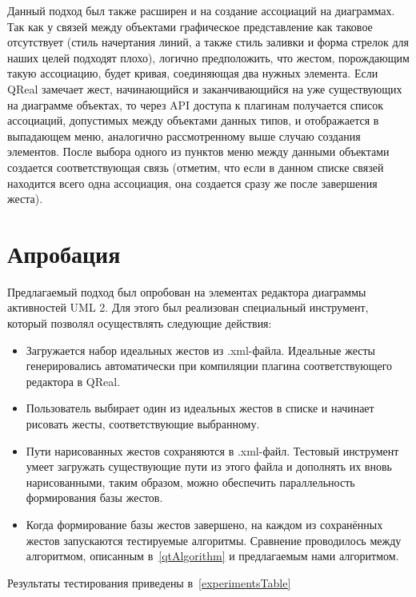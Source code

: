 \documentclass[a5paper]{article}
\begin{document}
Данный подход был также расширен и на создание ассоциаций на диаграммах. Так как у связей между объектами графическое представление
как таковое отсутствует (стиль начертания линий, а также стиль заливки и форма стрелок для наших целей подходят плохо), логично 
предположить, что жестом, порождающим такую ассоциацию, будет кривая, соединяющая два нужных элемента. Если QReal замечает жест,
начинающийся и заканчивающийся на уже существующих на диаграмме объектах, то через API доступа к плагинам получается список 
ассоциаций, допустимых между объектами данных типов, и отображается в выпадающем меню, аналогично рассмотренному выше случаю создания 
элементов. После выбора одного из пунктов меню между данными объектами создается соответствующая связь 
(отметим, что если в данном списке связей находится всего одна ассоциация, она создается сразу же после завершения жеста).

\section{Апробация}

Предлагаемый подход был опробован на элементах редактора диаграммы активностей UML 2. Для этого был реализован специальный инструмент, который позволял осуществлять следующие действия:
\begin{itemize}
  \item Загружается набор идеальных жестов из .xml-файла. Идеальные жесты генерировались автоматически при компиляции плагина соответствующего редактора в QReal.
  \item Пользователь выбирает один из идеальных жестов в списке и начинает рисовать жесты, соответствующие выбранному.
  \item Пути нарисованных жестов сохраняются в .xml-файл. Тестовый инструмент умеет загружать существующие пути из этого файла и дополнять их вновь нарисованными, таким образом, можно обеспечить параллельность формирования базы жестов.
  \item Когда формирование базы жестов завершено, на каждом из сохранённых жестов запускаются тестируемые алгоритмы. Сравнение проводилось между алгоритмом, описанным в~\ref{qtAlgorithm} и предлагаемым нами алгоритмом.
\end{itemize}

Результаты тестирования приведены в~\ref{experimentsTable}
\end{document}
